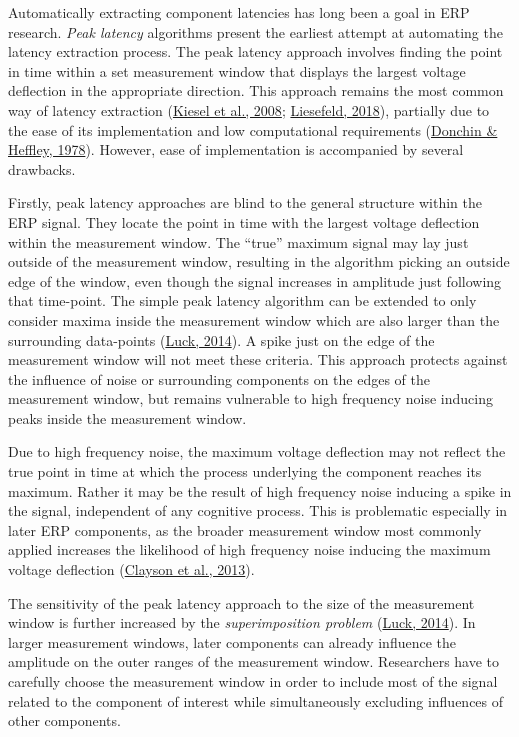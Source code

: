 \documentclass[
  man]{apa7}
\begin{document}
Automatically extracting component latencies has long been a goal in ERP research. \emph{Peak latency} algorithms present the earliest attempt at automating the latency extraction process. The peak latency approach involves finding the point in time within a set measurement window that displays the largest voltage deflection in the appropriate direction. This approach remains the most common way of latency extraction (\protect\hyperlink{ref-kiesel2008measurement}{Kiesel et al., 2008}; \protect\hyperlink{ref-liesefeld2018estimating}{Liesefeld, 2018}), partially due to the ease of its implementation and low computational requirements (\protect\hyperlink{ref-donchin1978multivariate}{Donchin \& Heffley, 1978}). However, ease of implementation is accompanied by several drawbacks.

Firstly, peak latency approaches are blind to the general structure within the ERP signal. They locate the point in time with the largest voltage deflection within the measurement window. The ``true'' maximum signal may lay just outside of the measurement window, resulting in the algorithm picking an outside edge of the window, even though the signal increases in amplitude just following that time-point. The simple peak latency algorithm can be extended to only consider maxima inside the measurement window which are also larger than the surrounding data-points (\protect\hyperlink{ref-luck2014introduction}{Luck, 2014}). A spike just on the edge of the measurement window will not meet these criteria. This approach protects against the influence of noise or surrounding components on the edges of the measurement window, but remains vulnerable to high frequency noise inducing peaks inside the measurement window.

Due to high frequency noise, the maximum voltage deflection may not reflect the true point in time at which the process underlying the component reaches its maximum. Rather it may be the result of high frequency noise inducing a spike in the signal, independent of any cognitive process. This is problematic especially in later ERP components, as the broader measurement window most commonly applied increases the likelihood of high frequency noise inducing the maximum voltage deflection (\protect\hyperlink{ref-clayson2013noise}{Clayson et al., 2013}).

The sensitivity of the peak latency approach to the size of the measurement window is further increased by the \emph{superimposition problem} (\protect\hyperlink{ref-luck2014introduction}{Luck, 2014}). In larger measurement windows, later components can already influence the amplitude on the outer ranges of the measurement window. Researchers have to carefully choose the measurement window in order to include most of the signal related to the component of interest while simultaneously excluding influences of other components.
\end{document}
